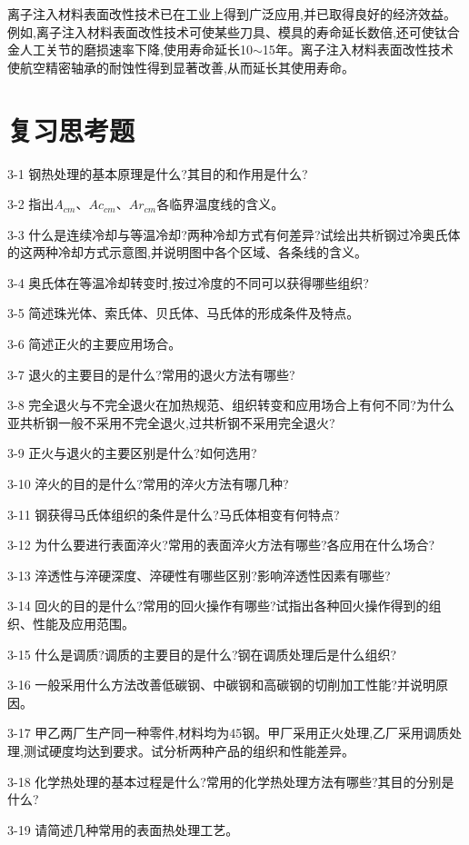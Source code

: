\documentclass[UTF8]{ctexbook}
\newcommand{\◎}{\ensuremath{\bigcirc}}
\begin{document}
离子注入材料表面改性技术已在工业上得到广泛应用,并已取得良好的经济效益。例如,离子注入材料表面改性技术可使某些刀具、模具的寿命延长数倍,还可使钛合金人工关节的磨损速率下降,使用寿命延长10$\sim$15年。离子注入材料表面改性技术使航空精密轴承的耐蚀性得到显著改善,从而延长其使用寿命。

\section*{复习思考题}

 
3-1 钢热处理的基本原理是什么?其目的和作用是什么?

3-2 指出$A_{cm}$、$Ac_{cm}$、$Ar_{cm}$各临界温度线的含义。

3-3 什么是连续冷却与等温冷却?两种冷却方式有何差异?试绘出共析钢过冷奥氏体的这两种冷却方式示意图,并说明图中各个区域、各条线的含义。

3-4 奥氏体在等温冷却转变时,按过冷度的不同可以获得哪些组织?

3-5 简述珠光体、索氏体、贝氏体、马氏体的形成条件及特点。

3-6 简述正火的主要应用场合。

3-7 退火的主要目的是什么?常用的退火方法有哪些?

3-8 完全退火与不完全退火在加热规范、组织转变和应用场合上有何不同?为什么亚共析钢一般不采用不完全退火,过共析钢不采用完全退火?

3-9 正火与退火的主要区别是什么?如何选用?

3-10 淬火的目的是什么?常用的淬火方法有哪几种?

3-11 钢获得马氏体组织的条件是什么?马氏体相变有何特点?

3-12 为什么要进行表面淬火?常用的表面淬火方法有哪些?各应用在什么场合?

3-13 淬透性与淬硬深度、淬硬性有哪些区别?影响淬透性因素有哪些?

3-14 回火的目的是什么?常用的回火操作有哪些?试指出各种回火操作得到的组织、性能及应用范围。

3-15 什么是调质?调质的主要目的是什么?钢在调质处理后是什么组织?

3-16 一般采用什么方法改善低碳钢、中碳钢和高碳钢的切削加工性能?并说明原因。

3-17 甲乙两厂生产同一种零件,材料均为45钢。甲厂采用正火处理,乙厂采用调质处理,测试硬度均达到要求。试分析两种产品的组织和性能差异。

3-18 化学热处理的基本过程是什么?常用的化学热处理方法有哪些?其目的分别是什么?

3-19 请简述几种常用的表面热处理工艺。
\end{document}
